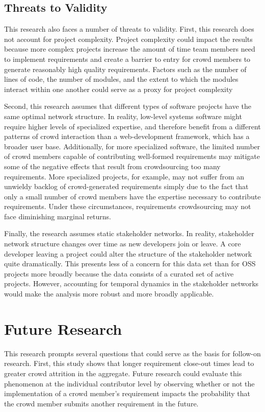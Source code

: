 \subsection{Threats to Validity}

This research also faces a number of threats to validity. First, this research does not account for project complexity. Project complexity could impact the results because more complex projects increase the amount of time team members need to implement requirements and create a barrier to entry for crowd members to generate reasonably high quality requirements. Factors such as the number of lines of code, the number of modules, and the extent to which the modules interact within one another could serve as a proxy for project complexity

Second, this research assumes that different types of software projects have the same optimal network structure. In reality, low-level systems software might require higher levels of specialized expertise, and therefore benefit from a different patterns of crowd interaction than a web-development framework, which has a broader user base. Additionally, for more specialized software, the limited number of crowd members capable of contributing well-formed requirements may mitigate some of the negative effects that result from crowdsourcing too many requirements. More specialized projects, for example, may not suffer from an unwieldy backlog of crowd-generated requirements simply due to the fact that only a small number of crowd members have the expertise necessary to contribute requirements. Under these circumstances, requirements crowdsourcing may not face diminishing marginal returns.

Finally, the research assumes static stakeholder networks. In reality, stakeholder network structure changes over time as new developers join or leave. A core developer leaving a project could alter the structure of the stakeholder network quite dramatically. This presents less of a concern for this data set than for OSS projects more broadly because the data consists of a curated set of active projects. However, accounting for temporal dynamics in the stakeholder networks would make the analysis more robust and more broadly applicable.

\section{Future Research}

This research prompts several questions that could serve as the basis for follow-on research. First, this study shows that longer requirement close-out times lead to greater crowd attrition in the aggregate. Future research could evaluate this phenomenon at the individual contributor level by observing whether or not the implementation of a crowd member's requirement impacts the probability that the crowd member submits another requirement in the future.

